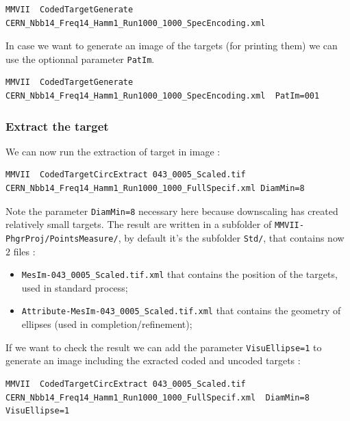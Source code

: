 \begin{lstlisting}
MMVII  CodedTargetGenerate  CERN_Nbb14_Freq14_Hamm1_Run1000_1000_SpecEncoding.xml
\end{lstlisting}

In case we want to generate an image of the targets (for printing them) we can
use the optionnal parameter {\tt PatIm}.

\begin{lstlisting}
MMVII  CodedTargetGenerate  CERN_Nbb14_Freq14_Hamm1_Run1000_1000_SpecEncoding.xml  PatIm=001
\end{lstlisting}


\subsubsection{Extract the target}

We can now run the extraction of target in image :

\begin{lstlisting}
MMVII  CodedTargetCircExtract 043_0005_Scaled.tif CERN_Nbb14_Freq14_Hamm1_Run1000_1000_FullSpecif.xml DiamMin=8
\end{lstlisting}

Note the parameter {\tt DiamMin=8} necessary here because downscaling has created relatively small targets. 
The result are written in a subfolder of {\tt MMVII-PhgrProj/PointsMeasure/}, by default it's the subfolder
{\tt Std/}, that contains now $2$ files :

\begin{itemize}
	\item {\tt MesIm-043\_0005\_Scaled.tif.xml} that contains the position of the targets, used in standard process;
	\item {\tt Attribute-MesIm-043\_0005\_Scaled.tif.xml} that contains the geometry of ellipses (used in completion/refinement);
\end{itemize}


If we want to check the result we can add the parameter {\tt VisuEllipse=1} to generate an image
including the exracted coded and uncoded targets :


\begin{lstlisting}
MMVII  CodedTargetCircExtract 043_0005_Scaled.tif CERN_Nbb14_Freq14_Hamm1_Run1000_1000_FullSpecif.xml  DiamMin=8 VisuEllipse=1
\end{lstlisting}

